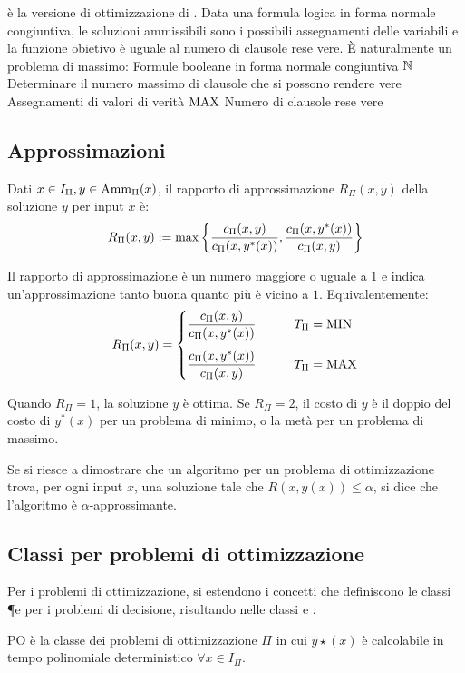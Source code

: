 \begin{examp}
	\MaxSat è la versione di ottimizzazione di \Sat. Data una formula logica in forma normale congiuntiva, le soluzioni ammissibili sono i possibili assegnamenti delle variabili e la funzione obietivo è uguale al numero di clausole rese vere. È naturalmente un problema di massimo:
	\popt{\MaxSat}
	{Formule booleane in forma normale congiuntiva}
	{$\mathbb N$}
	{Determinare il numero massimo di clausole che si possono rendere vere}
	{Assegnamenti di valori di verità}
	{$\mathrm{MAX}$}
	{Numero di clausole rese vere}
\end{examp}


\subsection{Approssimazioni}
\begin{defin}
	Dati $x\in I_\Pi, y\in\mathrm{Amm}_\Pi(x)$, il rapporto di approssimazione $R_\Pi(x,y)$ della soluzione $y$ per input $x$ è:
	\begin{equation*}
		R_\Pi(x,y):=\max\left\{ \frac{c_\Pi(x,y)}{c_\Pi(x,y^*(x))},\frac{c_\Pi(x,y^*(x))}{c_\Pi(x,y)} \right\}
	\end{equation*}
\end{defin}
\noindent Il rapporto di approssimazione è un numero maggiore o uguale a $1$ e indica un'approssimazione tanto buona quanto più è vicino a $1$. Equivalentemente:
\begin{equation*}
	R_\Pi(x,y)=\begin{cases}
		\dfrac{c_\Pi(x,y)}{c_\Pi(x,y^*(x))} \qquad & T_\Pi=\mathrm{MIN} \\[3ex]
		\dfrac{c_\Pi(x,y^*(x))}{c_\Pi(x,y)} \qquad & T_\Pi=\mathrm{MAX}
	\end{cases}
\end{equation*}

\begin{examp}
	Quando $R_{\Pi}=1$, la soluzione $y$ è ottima. Se $R_{\Pi} = 2$, il costo di $y$ è il doppio del costo di $y^*(x)$ per un problema di minimo, o la metà per un problema di massimo.
\end{examp}
Se si riesce a dimostrare che un algoritmo per un problema di ottimizzazione trova, per ogni input $x$, una soluzione tale che $R(x,y(x))\leq\alpha$, si dice che l'algoritmo è $\alpha$-approssimante.



\subsection{Classi per problemi di ottimizzazione}
Per i problemi di ottimizzazione, si estendono i concetti che definiscono le classi \P e \NP per i problemi di decisione, risultando nelle classi \PO e \NPO.
\begin{defin}[\PO]
	PO è la classe dei problemi di ottimizzazione $\Pi$ in cui $y\star(x)$ è calcolabile in tempo polinomiale deterministico $\forall x\in I_\Pi$.
\end{defin}

